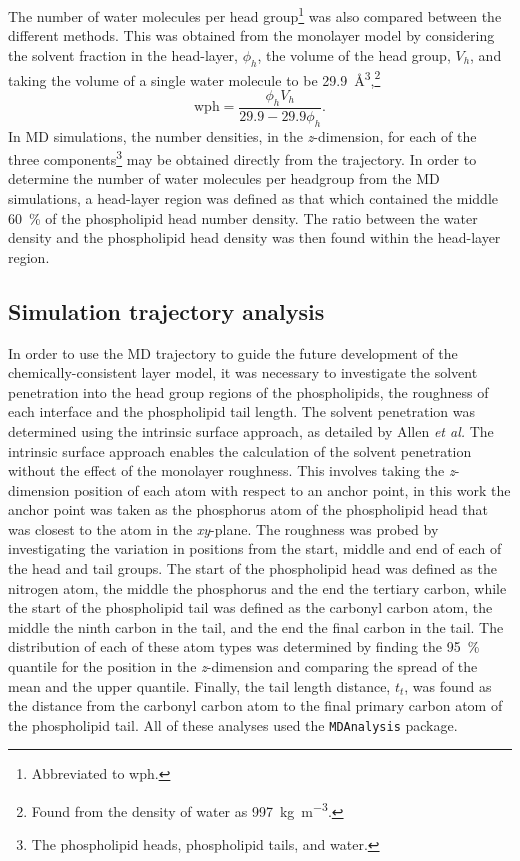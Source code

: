 The number of water molecules per head group\footnote{Abbreviated to wph.} was also compared between the different methods.
This was obtained from the monolayer model by considering the solvent fraction in the head-layer, $\phi_h$, the volume of the head group, $V_h$, and taking the volume of a single water molecule to be \SI{29.9}{\angstrom\cubed},\footnote{Found from the density of water as \SI{997}{\kg\per\meter\cubed}.}
%
\begin{equation}
\text{wph}=\frac{\phi_h V_h}{29.9 - 29.9\phi_h}.
\label{equ:wph}
\end{equation}
%
In MD simulations, the number densities, in the \emph{z}-dimension, for each of the three components\footnote{The phospholipid heads, phospholipid tails, and water.} may be obtained directly from the trajectory.
In order to determine the number of water molecules per headgroup from the MD simulations, a head-layer region was defined as that which contained the middle \SI{60}{\percent} of the phospholipid head number density.
The ratio between the water density and the phospholipid head density was then found within the head-layer region.

\subsection{Simulation trajectory analysis}
\label{sec:traj}
In order to use the MD trajectory to guide the future development of the chemically-consistent layer model, it was necessary to investigate the solvent penetration into the head group regions of the phospholipids, the roughness of each interface and the phospholipid tail length.
The solvent penetration was determined using the intrinsic surface approach, as detailed by Allen \emph{et al.}\autocite{allen_specific_2016,pandit_algorithm_2003}
The intrinsic surface approach enables the calculation of the solvent penetration without the effect of the monolayer roughness.
This involves taking the \emph{z}-dimension position of each atom with respect to an anchor point, in this work the anchor point was taken as the phosphorus atom of the phospholipid head that was closest to the atom in the \emph{xy}-plane.
The roughness was probed by investigating the variation in positions from the start, middle and end of each of the head and tail groups.
The start of the phospholipid head was defined as the nitrogen atom, the middle the phosphorus and the end the tertiary carbon, while the start of the phospholipid tail was defined as the carbonyl carbon atom, the middle the ninth carbon in the tail, and the end the final carbon in the tail.
The distribution of each of these atom types was determined by finding the \SI{95}{\percent} quantile for the position in the \emph{z}-dimension and comparing the spread of the mean and the upper quantile.
Finally, the tail length distance, $t_t$, was found as the distance from the carbonyl carbon atom to the final primary carbon atom of the phospholipid tail.
All of these analyses used the \texttt{MDAnalysis} package.\autocite{gowers_mdanalysis_2016,michaud-agrawal_mdanalysis_2011}
